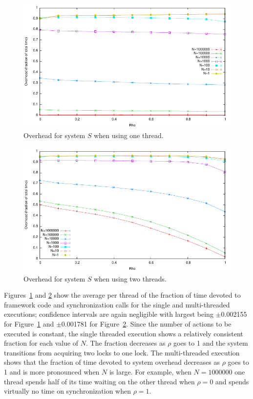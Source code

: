 \begin{figure}
\center
\includegraphics[width=\columnwidth]{overhead1}
\caption{Overhead for system $S$ when using one thread.\label{overhead1}}
\end{figure}

\begin{figure}
\center
\includegraphics[width=\columnwidth]{overhead2}
\caption{Overhead for system $S$ when using two threads.\label{overhead2}}
\end{figure}

Figures~\ref{overhead1} and \ref{overhead2} show the average per thread of the fraction of time devoted to framework code and synchronization calls for the single and multi-threaded executions; confidence intervals are again negligible with largest being $\pm$0.002155 for Figure~\ref{overhead1} and $\pm$0.001781 for Figure~\ref{overhead2}.
Since the number of actions to be executed is constant, the single threaded execution shows a relatively consistent fraction for each value of $N$.
The fraction decreases as $\rho$ goes to 1 and the system transitions from acquiring two locks to one lock.
The multi-threaded execution shows that the fraction of time devoted to system overhead decreases as $\rho$ goes to 1 and is more pronounced when $N$ is large.
For example, when $N=1000000$ one thread spends half of its time waiting on the other thread when $\rho = 0$ and spends virtually no time on synchronization when $\rho = 1$.

